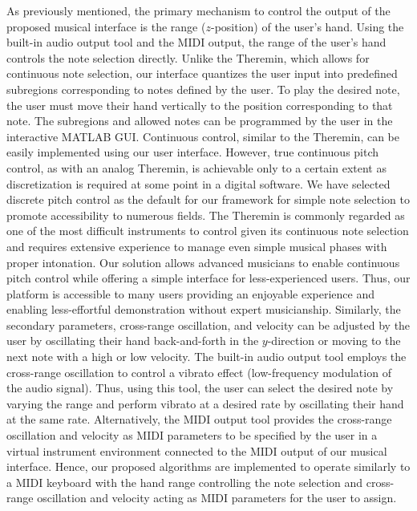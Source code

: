 \documentclass[10pt,journal,final]{IEEEtran}
\begin{document}
As previously mentioned, the primary mechanism to control the output of the proposed musical interface is the range ($z$-position) of the user's hand.
Using the built-in audio output tool and the MIDI output, the range of the user's hand controls the note selection directly. 
Unlike the Theremin, which allows for continuous note selection, our interface quantizes the user input into predefined subregions corresponding to notes defined by the user.
To play the desired note, the user must move their hand vertically to the position corresponding to that note. 
The subregions and allowed notes can be programmed by the user in the interactive MATLAB GUI.
Continuous control, similar to the Theremin, can be easily implemented using our user interface.
However, true continuous pitch control, as with an analog Theremin, is achievable only to a certain extent as discretization is required at some point in a digital software.
We have selected discrete pitch control as the default for our framework for simple note selection to promote accessibility to numerous fields.
The Theremin is commonly regarded as one of the most difficult instruments to control given its continuous note selection and requires extensive experience to manage even simple musical phases with proper intonation.
Our solution allows advanced musicians to enable continuous pitch control while offering a simple interface for less-experienced users.
Thus, our platform is accessible to many users providing an enjoyable experience and enabling less-effortful demonstration without expert musicianship.
Similarly, the secondary parameters, cross-range oscillation, and velocity can be adjusted by the user by oscillating their hand back-and-forth in the $y$-direction or moving to the next note with a high or low velocity.
The built-in audio output tool employs the cross-range oscillation to control a vibrato effect (low-frequency modulation of the audio signal).
Thus, using this tool, the user can select the desired note by varying the range and perform vibrato at a desired rate by oscillating their hand at the same rate.
Alternatively, the MIDI output tool provides the cross-range oscillation and velocity as MIDI parameters to be specified by the user in a virtual instrument environment connected to the MIDI output of our musical interface.
Hence, our proposed algorithms are implemented to operate similarly to a MIDI keyboard with the hand range controlling the note selection and cross-range oscillation and velocity acting as MIDI parameters for the user to assign.
\end{document}
